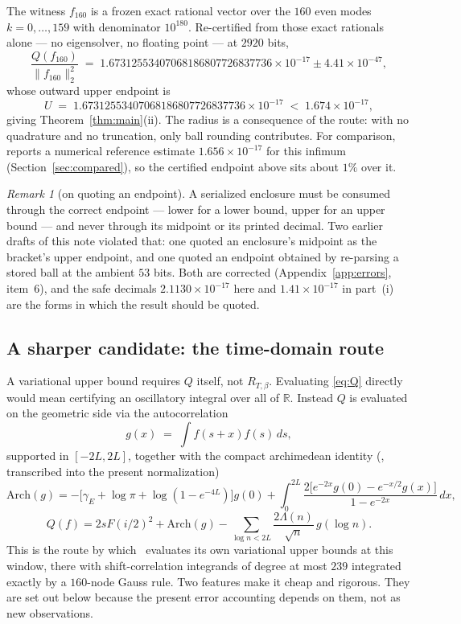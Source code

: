 \documentclass[11pt,a4paper]{article}
\theoremstyle{definition}
\theoremstyle{remark}
\newtheorem{remark}[theorem]{Remark}
\begin{document}
The witness $f_{160}$ is a frozen exact rational vector over the $160$ even modes
$k = 0,\dots,159$ with denominator $10^{180}$. Re-certified from those exact
rationals alone --- no eigensolver, no floating point --- at $2920$ bits,
\[
  \frac{Q(f_{160})}{\|f_{160}\|_2^2}
  \;=\; 1.67312553407068186807726837736\times10^{-17} \pm 4.41\times10^{-47},
\]
whose outward upper endpoint is
\[
  U \;=\; 1.67312553407068186807726837736\times10^{-17}
  \;<\; 1.674\times10^{-17},
\]
giving Theorem~\ref{thm:main}(ii). The radius is a consequence of the route:
with no quadrature and no truncation, only ball rounding contributes. For
comparison, \cite{Zhu} reports a numerical reference estimate
$1.656\times10^{-17}$ for this infimum (Section~\ref{sec:compared}), so the
certified endpoint above sits about $1\%$ over it.

\begin{remark}[on quoting an endpoint]
\label{rem:endpoint}
A serialized enclosure must be consumed through the correct endpoint --- lower
for a lower bound, upper for an upper bound --- and never through its midpoint
or its printed decimal. Two earlier drafts of this note violated that: one
quoted an enclosure's midpoint as the bracket's upper endpoint, and one quoted
an endpoint obtained by re-parsing a stored ball at the ambient $53$ bits. Both
are corrected (Appendix~\ref{app:errors}, item~6), and the safe decimals
$2.1130\times10^{-17}$ here and $1.41\times10^{-17}$ in part~(i) are the forms
in which the result should be quoted.
\end{remark}

\subsection{A sharper candidate: the time-domain route}
\label{sec:timedomain}

A variational upper bound requires $Q$ itself, not $R_{T,\beta}$. Evaluating
\eqref{eq:Q} directly would mean certifying an oscillatory integral over all of
$\mathbb{R}$. Instead $Q$ is evaluated on the geometric side via the
autocorrelation
\[
   g(x) \;=\; \int f(s+x) f(s)\, ds ,
\]
supported in $[-2L,2L]$, together with the compact archimedean identity
(\cite[Lemma 2.5]{Zhu}, transcribed into the present normalization)
\begin{equation}
\label{eq:arch}
   \mathrm{Arch}(g) = -\big[\gamma_E + \log\pi + \log(1 - e^{-4L})\big] g(0)
   + \int_{0}^{2L} \frac{2\big[e^{-2x}g(0) - e^{-x/2}g(x)\big]}{1 - e^{-2x}}\, dx ,
\end{equation}
\begin{equation}
\label{eq:Qcompact}
   Q(f) = 2sF(i/2)^2 + \mathrm{Arch}(g)
   - \sum_{\log n < 2L} \frac{2\Lambda(n)}{\sqrt n}\, g(\log n) .
\end{equation}
This is the route by which~\cite[\S6.2]{Zhu} evaluates its own variational upper
bounds at this window, there with shift-correlation integrands of degree at most
$239$ integrated exactly by a $160$-node Gauss rule. Two features make it cheap
and rigorous. They are set out below because the present error accounting
depends on them, not as new observations.
\end{document}
